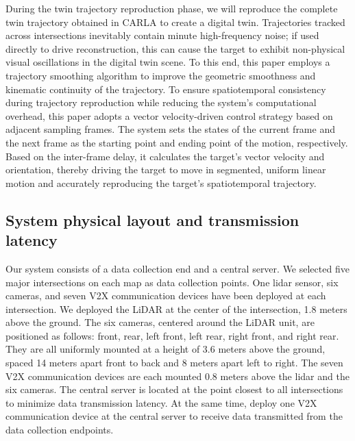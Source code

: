 \documentclass[lineno,pdflatex,sn-basic]{sn-jnl}%
\theoremstyle{thmstyleone}%
\theoremstyle{thmstyletwo}%
\theoremstyle{thmstylethree}%
\begin{document}
During the twin trajectory reproduction phase, we will reproduce the complete twin trajectory obtained in CARLA to create a digital twin.
Trajectories tracked across intersections inevitably contain minute high-frequency noise; if used directly to drive reconstruction, this can cause the target to exhibit non-physical visual oscillations in the digital twin scene.
To this end, this paper employs a trajectory smoothing algorithm to improve the geometric smoothness and kinematic continuity of the trajectory.
To ensure spatiotemporal consistency during trajectory reproduction while reducing the system’s computational overhead, this paper adopts a vector velocity-driven control strategy based on adjacent sampling frames.
The system sets the states of the current frame and the next frame as the starting point and ending point of the motion, respectively. Based on the inter-frame delay, it calculates the target’s vector velocity and orientation, thereby driving the target to move in segmented, uniform linear motion and accurately reproducing the target’s spatiotemporal trajectory.


\subsection{System physical layout and transmission latency}
Our system consists of a data collection end and a central server.
We selected five major intersections on each map as data collection points.
One lidar sensor, six cameras, and seven V2X communication devices have been deployed at each intersection.
We deployed the LiDAR at the center of the intersection, 1.8 meters above the ground.
The six cameras, centered around the LiDAR unit, are positioned as follows: front, rear, left front, left rear, right front, and right rear. They are all uniformly mounted at a height of 3.6 meters above the ground, spaced 14 meters apart front to back and 8 meters apart left to right.
The seven V2X communication devices are each mounted 0.8 meters above the lidar and the six cameras.
The central server is located at the point closest to all intersections to minimize data transmission latency.
At the same time, deploy one V2X communication device at the central server to receive data transmitted from the data collection endpoints.
\end{document}
